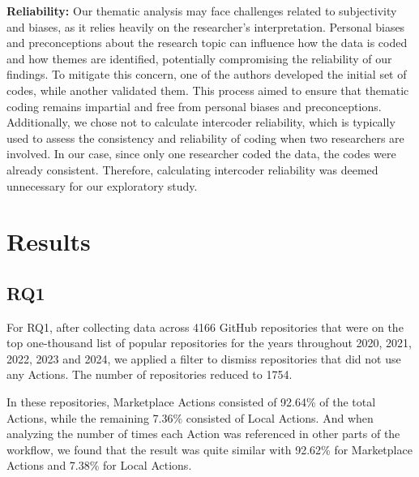 \documentclass[conference]{IEEEtran}
\begin{document}
	\textbf{Reliability:}  Our thematic analysis may face challenges related to subjectivity and biases, as it relies heavily on the researcher's interpretation. Personal biases and preconceptions about the research topic can influence how the data is coded and how themes are identified, potentially compromising the reliability of our findings. To mitigate this concern, one of the authors developed the initial set of codes, while another validated them. This process aimed to ensure that thematic coding remains impartial and free from personal biases and preconceptions. Additionally, we chose not to calculate intercoder reliability, which is typically used to assess the consistency and reliability of coding when two researchers are involved. In our case, since only one researcher coded the data, the codes were already consistent. Therefore, calculating intercoder reliability was deemed unnecessary for our exploratory study.



\section{Results}

  \subsection{RQ1}

      For RQ1, after collecting data across 4166 GitHub repositories that were on the top one-thousand list of popular repositories for the years throughout 2020, 2021, 2022, 2023 and 2024, we applied a filter to dismiss repositories that did not use any Actions. The number of repositories reduced to 1754. 

      In these repositories, Marketplace Actions consisted of 92.64\% of the total Actions, while the remaining 7.36\% consisted of Local Actions. And when analyzing the number of times each Action was referenced in other parts of the workflow, we found that the result was quite similar with 92.62\% for Marketplace Actions and 7.38\% for Local Actions.
\end{document}
